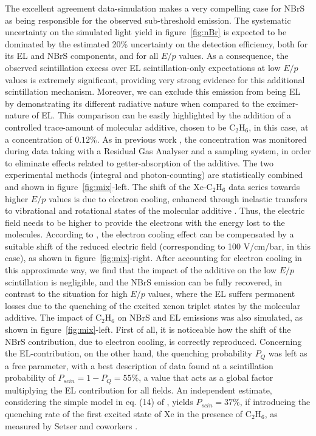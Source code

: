 \documentclass[%
 reprint,
superscriptaddress,
 amsmath,amssymb,
 aps,
]{revtex4-2}
\begin{document}
The excellent agreement data-simulation makes a very compelling case for NBrS as being responsible for the observed sub-threshold emission. The systematic uncertainty on the simulated light yield in figure~\ref{fig:nBr} is expected to be dominated by the estimated 20\% uncertainty on the detection efficiency, both for its EL and NBrS components, and for all $E/p$ values. As a consequence, the observed scintillation excess over EL scintillation-only expectations at low $E/p$ values is extremely significant, providing very strong evidence for this additional scintillation mechanism. Moreover, we can exclude this emission from being EL by demonstrating its different radiative nature when compared to the excimer-nature of EL. This comparison can be easily highlighted by the addition of a controlled trace-amount of molecular additive, chosen to be C$_{2}$H$_{6}$, in this case, at a concentration of $0.12\%$. As in previous work \cite{42,44}, the concentration was monitored during data taking with a Residual Gas Analyser and a sampling system, in order to eliminate effects related to getter-absorption of the additive. The two experimental methods (integral and photon-counting) are statistically combined and shown in figure~\ref{fig:mix}-left.
The shift of the Xe-C$_{2}$H$_{6}$ data series towards higher $E/p$ values is due to electron cooling, enhanced through inelastic transfers to vibrational and rotational states of the molecular additive \cite{42,32,44}. Thus, the electric field needs to be higher to provide the electrons with the energy lost to the molecules. According to \cite{CH_thesis}, the electron cooling effect can be compensated by a suitable shift of the reduced electric field (corresponding to 100 V/cm/bar, in this case), as shown in figure~\ref{fig:mix}-right. After accounting for electron cooling in this approximate way, we find that the impact of the additive on the low $E/p$ scintillation is negligible, and the NBrS emission can be fully recovered, in contrast to the situation for high $E/p$ values, where the EL suffers permanent losses due to the quenching of the excited xenon triplet states by the molecular additive. 
The impact of C$_{2}$H$_{6}$ on NBrS and EL emissions was also simulated, as shown in figure~\ref{fig:mix}-left. First of all, it is noticeable how the shift of the NBrS contribution, due to electron cooling, is correctly reproduced. Concerning the EL-contribution, on the other hand, the quenching probability $P_Q$ was left as a free parameter, with a best description of data found at a scintillation probability of $P_{scin}= 1- P_Q =55\%$, a value that acts as a global factor multiplying the EL contribution for all fields. An independent estimate, considering the simple model in eq. (14) of \cite{32}, yields $P_{scin}=37\%$, if introducing the quenching rate of the first excited state of Xe in the presence of C$_2$H$_6$, as measured by Setser and coworkers \cite{Setser}.
\end{document}
